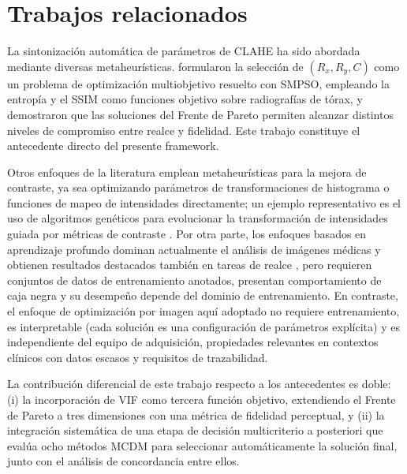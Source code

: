 \section{Trabajos relacionados}

La sintonización automática de parámetros de CLAHE ha sido abordada mediante diversas metaheurísticas. \citet{More2015} formularon la selección de $(R_x, R_y, C)$ como un problema de optimización multiobjetivo resuelto con SMPSO, empleando la entropía y el SSIM como funciones objetivo sobre radiografías de tórax, y demostraron que las soluciones del Frente de Pareto permiten alcanzar distintos niveles de compromiso entre realce y fidelidad. Este trabajo constituye el antecedente directo del presente framework.

Otros enfoques de la literatura emplean metaheurísticas para la mejora de contraste, ya sea optimizando parámetros de transformaciones de histograma o funciones de mapeo de intensidades directamente; un ejemplo representativo es el uso de algoritmos genéticos para evolucionar la transformación de intensidades guiada por métricas de contraste \citep{Hashemi2010}. Por otra parte, los enfoques basados en aprendizaje profundo dominan actualmente el análisis de imágenes médicas y obtienen resultados destacados también en tareas de realce \citep{Litjens2017}, pero requieren conjuntos de datos de entrenamiento anotados, presentan comportamiento de caja negra y su desempeño depende del dominio de entrenamiento. En contraste, el enfoque de optimización por imagen aquí adoptado no requiere entrenamiento, es interpretable (cada solución es una configuración de parámetros explícita) y es independiente del equipo de adquisición, propiedades relevantes en contextos clínicos con datos escasos y requisitos de trazabilidad.

La contribución diferencial de este trabajo respecto a los antecedentes es doble: (i) la incorporación de VIF como tercera función objetivo, extendiendo el Frente de Pareto a tres dimensiones con una métrica de fidelidad perceptual, y (ii) la integración sistemática de una etapa de decisión multicriterio a posteriori que evalúa ocho métodos MCDM para seleccionar automáticamente la solución final, junto con el análisis de concordancia entre ellos.
